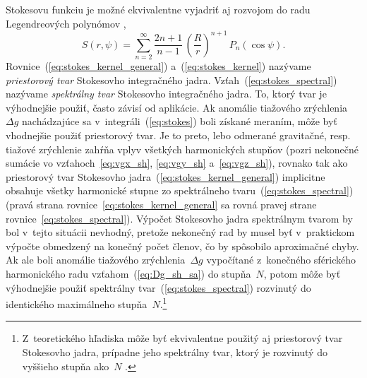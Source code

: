 \documentclass[a4paper, 12pt]{book}
\begin{document}
Stokesovu funkciu je možné ekvivalentne vyjadriť aj rozvojom do radu 
Legendreových polynómov \parencite{MoritzPhysicalGeodesy},
%
\begin{equation}
\label{eq:stokes_spectral}
S(r, \psi) = \sum_{n = 2}^{\infty} \frac{2n + 1}{n - 1} \, \left( \frac{R}{r} 
\right)^{n + 1} \, P_n(\cos\psi){.}
\end{equation}
%
Rovnice~(\ref{eq:stokes_kernel_general}) a~(\ref{eq:stokes_kernel}) nazývame 
\emph{priestorový tvar} Stokesovho integračného jadra.  
Vzťah~(\ref{eq:stokes_spectral}) nazývame \emph{spektrálny tvar} Stokesovho 
integračného jadra.  To, ktorý tvar je výhodnejšie použiť, často závisí od 
aplikácie.  Ak anomálie tiažového zrýchlenia~$\Delta g$ nachádzajúce sa 
v~integráli~(\ref{eq:stokes}) boli získané meraním, môže byť vhodnejšie použiť 
priestorový tvar.  Je to preto, lebo odmerané gravitačné, resp. tiažové 
zrýchlenie zahŕňa vplyv všetkých harmonických stupňov (pozri nekonečné sumácie 
vo vzťahoch~\ref{eq:vgx_sh}, \ref{eq:vgy_sh} a~\ref{eq:vgz_sh}), rovnako tak 
ako priestorový tvar Stokesovho jadra~(\ref{eq:stokes_kernel_general}) 
implicitne obsahuje všetky harmonické stupne zo spektrálneho 
tvaru~(\ref{eq:stokes_spectral}) (pravá strana 
rovnice~\ref{eq:stokes_kernel_general} sa rovná pravej strane 
rovnice~\ref{eq:stokes_spectral}).  Výpočet Stokesovho jadra spektrálnym tvarom 
by bol v~tejto situácii nevhodný, pretože nekonečný rad by musel byť 
v~praktickom výpočte obmedzený na konečný počet členov, čo by spôsobilo 
aproximačné chyby.  Ak ale boli anomálie tiažového zrýchlenia~$\Delta g$ 
vypočítané z~konečného sférického harmonického radu vzťahom~(\ref{eq:Dg_sh_sa}) 
do stupňa~$N$, potom môže byť výhodnejšie použiť spektrálny 
tvar~(\ref{eq:stokes_spectral}) rozvinutý do identického maximálneho 
stupňa~$N$.\footnote{Z~teoretického hľadiska môže byť ekvivalentne použitý aj 
priestorový tvar Stokesovho jadra, prípadne jeho spektrálny tvar, ktorý je 
rozvinutý do vyššieho stupňa ako~$N$ \parencite[pozri 
napríklad][]{Freeden2009}.}
\end{document}
